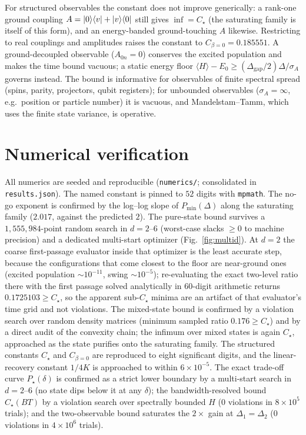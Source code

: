 \documentclass[aps,pra,twocolumn,superscriptaddress,nofootinbib,longbibliography]{revtex4-2}
\newcommand{\Ctrue}{C_{\star}}
\newcommand{\mean}[1]{\langle #1 \rangle}
\begin{document}
For structured observables the constant does not improve generically: a rank-one ground coupling
$A=\ket0\!\bra v+\ket v\!\bra0$ still gives $\inf=\Ctrue$ (the saturating family is itself of this form), and
an energy-banded ground-touching $A$ likewise. Restricting to real couplings and amplitudes raises the
constant to $C_{\beta=0}=0.185551$. A ground-decoupled observable ($A_{0n}=0$) conserves the excited
population and makes the time bound vacuous; a static energy floor $\mean H-E_0\ge(\Delta_{\mathrm{gap}}/2)\Delta/\sigma_A$
governs instead. The bound is informative for observables of finite spectral spread (spins, parity,
projectors, qubit registers); for unbounded observables ($\sigma_A=\infty$, e.g.\ position or particle number)
it is vacuous, and Mandelstam--Tamm, which uses the finite state variance, is operative.

\section{Numerical verification}
\label{sec:numerics}
All numerics are seeded and reproducible (\texttt{numerics/}; consolidated in
\texttt{results.json}). The named constant is pinned to $52$ digits with \texttt{mpmath}. The no-go exponent
is confirmed by the log--log slope of $P_{\min}(\Delta)$ along the saturating family ($2.017$, against the
predicted $2$). The pure-state bound survives a $1{,}555{,}984$-point random search in $d=2$--$6$
(worst-case slacks $\ge0$ to machine precision) and a dedicated multi-start optimizer
(Fig.~\ref{fig:multid}). At $d=2$ the coarse first-passage evaluator inside that optimizer is the least
accurate step, because the configurations that come closest to the floor are near-ground ones (excited
population $\sim10^{-11}$, swing $\sim10^{-5}$); re-evaluating the exact two-level ratio there with the
first passage solved analytically in $60$-digit arithmetic returns $0.1725103\ge\Ctrue$, so the apparent
sub-$\Ctrue$ minima are an artifact of that evaluator's time grid and not violations. The
mixed-state bound is confirmed by a violation search over random density matrices (minimum sampled ratio
$0.176\ge\Ctrue$) and by a direct audit of the convexity chain; the infimum over mixed states is again
$\Ctrue$, approached as the state purifies onto the saturating family. The structured constants $\Ctrue$
and $C_{\beta=0}$ are reproduced to eight significant digits, and the linear-recovery constant $1/4K$ is
approached to within $6\times10^{-5}$. The exact trade-off curve $P_\star(\delta)$ is confirmed as a strict lower boundary
by a multi-start search in $d=2$--$6$ (no state dips below it at any $\delta$); the bandwidth-resolved bound
$\Ctrue(BT)$ by a violation search over spectrally bounded $H$ ($0$ violations in $8\times10^5$ trials); and
the two-observable bound saturates the $2\times$ gain at $\Delta_1=\Delta_2$ ($0$ violations in
$4\times10^6$ trials).
\end{document}
